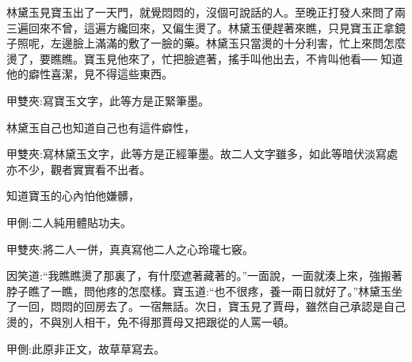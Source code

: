 \begin{parag}
    林黛玉見寶玉出了一天門，就覺悶悶的，沒個可說話的人。至晚正打發人來問了兩三遍回來不曾，這遍方纔回來，又偏生燙了。林黛玉便趕著來瞧，只見寶玉正拿鏡子照呢，左邊臉上滿滿的敷了一臉的藥。林黛玉只當燙的十分利害，忙上來問怎麼燙了，要瞧瞧。寶玉見他來了，忙把臉遮著，搖手叫他出去，不肯叫他看── 知道他的癖性喜潔，見不得這些東西。\begin{note}甲雙夾:寫寶玉文字，此等方是正緊筆墨。\end{note}林黛玉自己也知道自己也有這件癖性，\begin{note}甲雙夾:寫林黛玉文字，此等方是正經筆墨。故二人文字雖多，如此等暗伏淡寫處亦不少，觀者實實看不出者。\end{note}知道寶玉的心內怕他嫌髒，\begin{note}甲側:二人純用體貼功夫。\end{note}\begin{note}甲雙夾:將二人一併，真真寫他二人之心玲瓏七竅。\end{note}因笑道:“我瞧瞧燙了那裏了，有什麼遮著藏著的。”一面說，一面就湊上來，強搬著脖子瞧了一瞧，問他疼的怎麼樣。寶玉道:“也不很疼，養一兩日就好了。”林黛玉坐了一回，悶悶的回房去了。一宿無話。次日，寶玉見了賈母，雖然自己承認是自己燙的，不與別人相干，免不得那賈母又把跟從的人罵一頓。\begin{note}甲側:此原非正文，故草草寫去。\end{note}
\end{parag}


